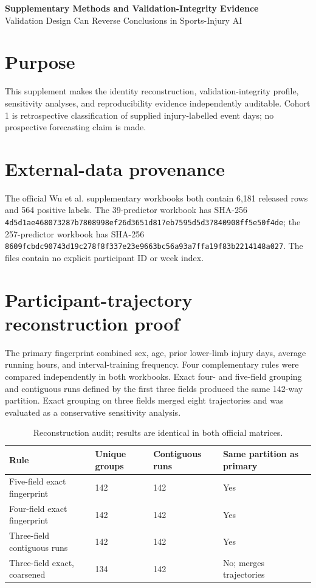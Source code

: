 \documentclass[11pt,a4paper]{article}
\begin{document}
\begin{center}
{\Large\textbf{Supplementary Methods and Validation-Integrity Evidence}}\\[0.3cm]
{\large Validation Design Can Reverse Conclusions in Sports-Injury AI}
\end{center}

\section{Purpose}

This supplement makes the identity reconstruction, validation-integrity
profile, sensitivity analyses, and reproducibility evidence independently
auditable. Cohort 1 is retrospective classification of supplied injury-labelled
event days; no prospective forecasting claim is made.

\section{External-data provenance}

The official Wu et al. supplementary workbooks both contain 6,181 released
rows and 564 positive labels. The 39-predictor workbook has SHA-256
\texttt{4d5d1ae468073287b7808998ef26d3651d817eb7595d5d37840908ff5e50f4de};
the 257-predictor workbook has SHA-256
\texttt{8609fcbdc90743d19c278f8f337e23e9663bc56a93a7ffa19f83b2214148a027}.
The files contain no explicit participant ID or week index.

\section{Participant-trajectory reconstruction proof}

The primary fingerprint combined sex, age, prior lower-limb injury days,
average running hours, and interval-training frequency. Four complementary
rules were compared independently in both workbooks. Exact four- and five-field
grouping and contiguous runs defined by the first three fields produced the
same 142-way partition. Exact grouping on three fields merged eight
trajectories and was evaluated as a conservative sensitivity analysis.

\begin{table}[h]
\centering
\small
\caption{Reconstruction audit; results are identical in both official matrices.}
\begin{tabular}{L{4.7cm} C{2.4cm} C{2.4cm} C{3.4cm}}
\toprule
\textbf{Rule} & \textbf{Unique groups} & \textbf{Contiguous runs} & \textbf{Same partition as primary} \\
\midrule
Five-field exact fingerprint & 142 & 142 & Yes \\
Four-field exact fingerprint & 142 & 142 & Yes \\
Three-field contiguous runs & 142 & 142 & Yes \\
Three-field exact, coarsened & 134 & 142 & No; merges trajectories \\
\bottomrule
\end{tabular}
\end{table}
\end{document}
